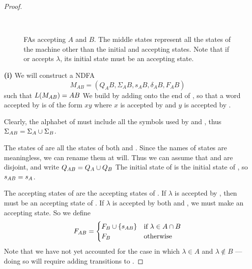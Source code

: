 \documentclass{bcthesis}
\begin{document}
\begin{proof}
		\begin{figure}[H]
			\centering
			\setlength{\fboxrule}{0 pt}
			\\
			\caption{
			FAs accepting $A$ and $B$.
			The middle states represent all the states of the machine other than the initial and accepting states.
			Note that if \ma or \mb accepts $\lambda$, its initial state must be an accepting state.
			}
			\label{fig:ma_and_mb}
		\end{figure}

		\noindent \textbf{(i)} \hspace{\parindent}
		We will construct a NDFA 
		\[
			M_{AB} = (Q_AB, \Sigma_AB, s_AB, \delta_AB, F_AB)
		\]
		 such that $L(M_{AB}) = AB$
		We build \mab by adding \mb onto the end of \ma, so that a word accepted by \mab is of the form $xy$ where $x$ is accepted by \ma and $y$ is accepted by \mb.

		Clearly, the alphabet of \mab must include all the symbols used by \ma and \mb, thus $\Sigma_{AB} = \Sigma_A \cup \Sigma_B$.
		
		The states of \mab are all the states of both \ma and \mb.
		Since the names of states are meaningless, we can rename them at will. 
		Thus we can assume that \qa and \qb are disjoint, and write $Q_{AB} = Q_A \cup Q_B$
		The initial state of \mab is the initial state of \ma, so $s_{AB} = s_A$.

		The accepting states of \mab are the accepting states of \mb.
		If $\lambda$ is accepted by \mb, then \sb must be an accepting state of \mb.
		If $\lambda$ is accepted by both \ma and \mb, we must make \sab an accepting state.
		So we define
		\[
			F_{AB} = 	\begin{cases}
						F_B \cup \{ s_{AB} \} &\text{if } \lambda \in A \cap B \\
						F_B &\text{otherwise}
					\end{cases}
		\]
		Note that we have not yet accounted for the case in which $\lambda \in A$ and $\lambda \notin B$ --- doing so will require adding transitions to \mab.


\end{proof}
\end{document}
